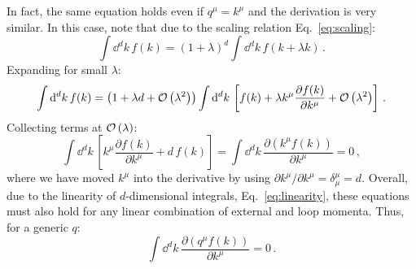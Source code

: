 \documentclass[main.tex]{subfiles}
\begin{document}
In fact, the same equation holds even if $q^\mu = k^\mu$ and the derivation is very similar. In this case, note that due to the scaling relation Eq.~\ref{eq:scaling}:
\begin{equation}
    \int \dd^d k\, f(k) = (1+\lambda)^d \int \dd^d k\, f(k+\lambda k) \,.
\end{equation}
Expanding for small $\lambda$:
\begin{equation}
    \int \mathrm{d}^d k\, f(k) = \left(1+\lambda d + \mathcal{O}\left(\lambda^2\right)\right) \int \mathrm{d}^d k\, \left[ f(k) + \lambda k^\mu \frac{\partial f(k)}{\partial k^\mu} + \mathcal{O}\left(\lambda^2\right) \right]\,.
\end{equation}
Collecting terms at $\mathcal{O}\left(\lambda\right)$:
\begin{equation}
    \int \dd^d k\, \left[ k^\mu \frac{\partial f(k)}{\partial k^\mu} + d\, f(k) \right] = \int \dd^d k\, \frac{\partial(k^\mu f(k))}{\partial k^\mu} = 0\,,
\end{equation}
where we have moved $k^\mu$ into the derivative by using $\partial k^\mu / \partial k^\mu = \delta^\mu_\mu=d$. Overall, due to the linearity of $d$-dimensional integrals, Eq.~\ref{eq:linearity}, these equations must also hold for any linear combination of external and loop momenta. Thus, for a generic $q$:
\begin{equation} \label{eq:IBPboundaryterm}
    \int \dd^d k\, \frac{\partial(q^\mu f(k))}{\partial k^\mu} = 0\,.
\end{equation}
\end{document}
